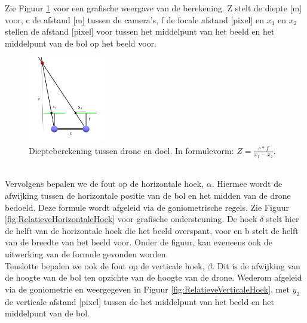 Zie Figuur \ref{fig:DiepteberekeningDroneEnDoel} voor een grafische weergave van de berekening. Z stelt de diepte [m] voor, c de afstand [m] tussen de camera's, f de focale afstand [pixel] en $x_1$ en $x_2$ stellen de afstand [pixel] voor tussen het middelpunt van het beeld en het middelpunt van de bol op het beeld voor.
\begin{figure}[h]
	\centering
	\includegraphics[width=0.3\textwidth]{DiepteberekeningDroneEnDoel.png}
	\caption{Diepteberekening tussen drone en doel. In formulevorm: \(Z = \frac{c * f}{x_1 - x_2}\).}
	\label{fig:DiepteberekeningDroneEnDoel}
\end{figure}
\\
Vervolgens bepalen we de fout op de horizontale hoek, $\alpha$. Hiermee wordt de afwijking tussen de horizontale positie van de bol en het midden van de drone bedoeld. Deze formule wordt afgeleid via de goniometrische regels. Zie Figuur \ref{fig:RelatieveHorizontaleHoek} voor grafische ondersteuning. De hoek $\delta$ stelt hier de helft van de horizontale hoek die het beeld overspant, voor en b stelt de helft van de breedte van het beeld voor. Onder de figuur, kan eveneens ook de uitwerking van de formule gevonden worden.
\\
Tenslotte bepalen we ook de fout op de verticale hoek, $\beta$. Dit is de afwijking van de hoogte van de bol ten opzichte van de hoogte van de drone. Wederom afgeleid via de goniometrie en weergegeven in Figuur \ref{fig:RelatieveVerticaleHoek}, met $y_2$ de verticale afstand [pixel] tussen de het middelpunt van het beeld en het middelpunt van de bol.
